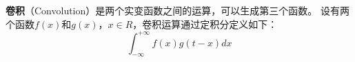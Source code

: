 
\textbf{卷积}（Convolution）是两个实变函数之间的运算，可以生成第三个函数。
设有两个函数$f(x)$和$g(x)$，$x \in R$，卷积运算通过定积分定义如下：
\begin{equation}
\int_{ - \infty }^{ + \infty } {f(x)g(t - x)dx}
\end{equation}